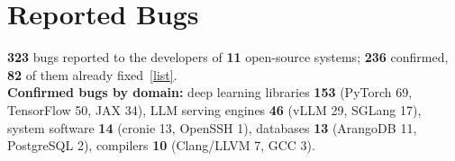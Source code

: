 \section{Reported Bugs}

    \begin{onecolentry}
        \textbf{323} bugs reported to the developers of \textbf{11} open-source systems; \textbf{236} confirmed, \textbf{82} of them already fixed~\href{https://abidnazirisami.github.io/bugs/}{[list]}. \\
        \textbf{Confirmed bugs by domain:} deep learning libraries \textbf{153} (PyTorch 69, TensorFlow 50, JAX 34), LLM serving engines \textbf{46} (vLLM 29, SGLang 17), system software \textbf{14} (cronie 13, OpenSSH 1), databases \textbf{13} (ArangoDB 11, PostgreSQL 2), compilers \textbf{10} (Clang/LLVM 7, GCC 3).
    \end{onecolentry}
